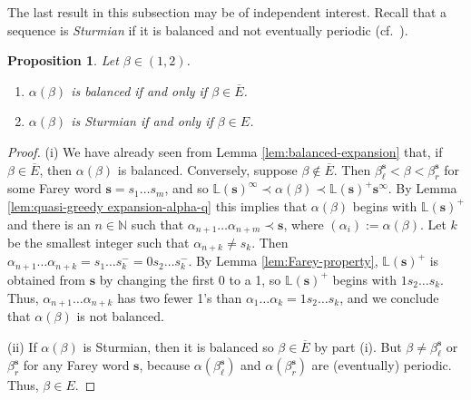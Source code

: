 \documentclass[11pt]{amsart}
\newtheorem{proposition}[theorem]{Proposition}
\theoremstyle{definition}
\theoremstyle{remark}
\numberwithin{equation}{section}
\newcommand{\N}{\ensuremath{\mathbb{N}}}
\renewcommand{\L}{\ensuremath{\mathbb{L}}}
\newcommand{\s}{ {\mathbf{s}}}
\newcommand{\f}{\infty}
\newcommand{\al}{\alpha}
\begin{document}
The last result in this subsection may be of independent interest. Recall that a sequence is {\em Sturmian} if it is balanced and not eventually periodic (cf.~\cite{Lothaire-2002}).

\begin{proposition} \label{prop:Sturmian}
Let $\beta\in(1,2)$.
\begin{enumerate}[{\rm(i)}]
\item $\al(\beta)$ is balanced if and only if $\beta\in\overline{E}$.
\item $\al(\beta)$ is Sturmian if and only if $\beta\in E$.
\end{enumerate}
\end{proposition}

\begin{proof}
(i) We have already seen from Lemma \ref{lem:balanced-expansion} that, if $\beta\in\overline{E}$, then $\al(\beta)$ is balanced. Conversely, suppose $\beta\not\in\overline{E}$. Then $\beta_\ell^{\s}<\beta<\beta_r^{\s}$ for some Farey word $\s=s_1\dots s_m$, and so $\L(\s)^\f\prec\al(\beta)\prec \L(\s)^+\s^\f$. By Lemma \ref{lem:quasi-greedy expansion-alpha-q} this implies that $\al(\beta)$ begins with $\L(\s)^+$ and there is an $n\in\N$ such that $\al_{n+1}\dots\al_{n+m}\prec\s$, where $(\al_i):=\al(\beta)$. Let $k$ be the smallest integer such that $\al_{n+k}\neq s_k$. %
Then $\al_{n+1}\dots\al_{n+k}=s_1\dots s_k^-=0s_2\dots s_k^-$. By Lemma \ref{lem:Farey-property}, $\L(\s)^+$ is obtained from $\s$ by changing the first 0 to a 1, so $\L(\s)^+$ begins with $1s_2\dots s_k$. Thus, $\al_{n+1}\dots\al_{n+k}$ has two fewer 1's than $\al_1\dots\al_k=1s_2\ldots s_k$, and we conclude that $\al(\beta)$ is not balanced.

(ii) If $\al(\beta)$ is Sturmian, then it is balanced so $\beta\in\overline{E}$ by part (i). But $\beta\neq \beta_\ell^{\s}$ or $\beta_r^{\s}$ for any Farey word $\s$, because $\al(\beta_\ell^{\s})$ and $\al(\beta_r^{\s})$ are (eventually) periodic. Thus, $\beta\in E$.


\end{proof}
\end{document}
